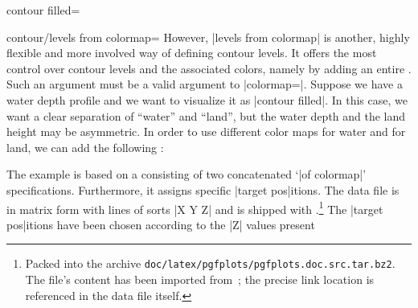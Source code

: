 {{\begin{plottype}[/pgfplots]{
    contour filled=\textcolor{black}{}%
}
\begin{pgfplotskey}{contour/levels from colormap=}
        However, |levels from colormap| is another, highly flexible and more
        involved way of defining contour levels. It offers the most control
        over contour levels and the associated colors, namely by adding an
        entire . Such an argument must be a valid
        argument to |colormap=|. Suppose
        we have a water depth profile and we want to visualize it as
        |contour filled|. In this case, we want a clear separation of ``water''
        and ``land'', but the water depth and the land height may be
        asymmetric. In order to use different color maps for water and for
        land, we can add the following :
\pgfplotsexpensiveexample
\begin{codeexample}[]
\end{codeexample}
        The example is based on a  consisting of two
        concatenated `|of colormap|' specifications. Furthermore, it assigns
        specific |target pos|itions. The data file is in matrix form with lines
        of sorts |X Y Z| and is shipped with \PGFPlots{}.\footnote{Packed into
        the archive \texttt{doc/latex/pgfplots/pgfplots.doc.src.tar.bz2}. The
        file's content has been imported from~\cite{LiveAccessServer}; the
        precise link location is referenced in the data file itself.} The
        |target pos|itions have been chosen according to the |Z| values present

\end{pgfplotskey}
\end{plottype}}}

